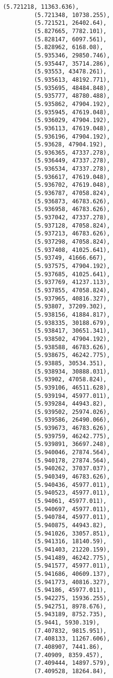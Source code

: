 \documentclass[11pt]{article}
\begin{document}
\begin{Verbatim}[commandchars=\\\{\}]
         (5.721218, 11363.636),
         (5.721348, 10738.255),
         (5.721521, 26402.64),
         (5.827665, 7782.101),
         (5.828147, 6097.561),
         (5.828962, 6168.08),
         (5.935346, 29850.746),
         (5.935447, 35714.286),
         (5.93553, 43478.261),
         (5.935613, 48192.771),
         (5.935695, 48484.848),
         (5.935777, 48780.488),
         (5.935862, 47904.192),
         (5.935945, 47619.048),
         (5.936029, 47904.192),
         (5.936113, 47619.048),
         (5.936196, 47904.192),
         (5.93628, 47904.192),
         (5.936365, 47337.278),
         (5.936449, 47337.278),
         (5.936534, 47337.278),
         (5.936617, 47619.048),
         (5.936702, 47619.048),
         (5.936787, 47058.824),
         (5.936873, 46783.626),
         (5.936958, 46783.626),
         (5.937042, 47337.278),
         (5.937128, 47058.824),
         (5.937213, 46783.626),
         (5.937298, 47058.824),
         (5.937408, 41025.641),
         (5.93749, 41666.667),
         (5.937575, 47904.192),
         (5.937685, 41025.641),
         (5.937769, 41237.113),
         (5.937855, 47058.824),
         (5.937965, 40816.327),
         (5.93807, 37209.302),
         (5.938156, 41884.817),
         (5.938335, 30188.679),
         (5.938417, 30651.341),
         (5.938502, 47904.192),
         (5.938588, 46783.626),
         (5.938675, 46242.775),
         (5.93885, 30534.351),
         (5.938934, 30888.031),
         (5.93902, 47058.824),
         (5.939106, 46511.628),
         (5.939194, 45977.011),
         (5.939284, 44943.82),
         (5.939502, 25974.026),
         (5.939586, 26490.066),
         (5.939673, 46783.626),
         (5.939759, 46242.775),
         (5.939891, 36697.248),
         (5.940046, 27874.564),
         (5.940178, 27874.564),
         (5.940262, 37037.037),
         (5.940349, 46783.626),
         (5.940436, 45977.011),
         (5.940523, 45977.011),
         (5.94061, 45977.011),
         (5.940697, 45977.011),
         (5.940784, 45977.011),
         (5.940875, 44943.82),
         (5.941026, 33057.851),
         (5.941316, 18140.59),
         (5.941403, 21220.159),
         (5.941489, 46242.775),
         (5.941577, 45977.011),
         (5.941686, 40609.137),
         (5.941773, 40816.327),
         (5.94186, 45977.011),
         (5.942275, 15936.255),
         (5.942751, 8978.676),
         (5.943189, 8752.735),
         (5.9441, 5930.319),
         (7.407832, 9815.951),
         (7.408133, 11267.606),
         (7.408907, 7441.86),
         (7.40909, 8359.457),
         (7.409444, 14897.579),
         (7.409528, 18264.84),

\end{Verbatim}
\end{document}
